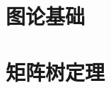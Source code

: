 \section{图论基础}
\label{gtbasic:sec:basic}

\questions


\section{矩阵树定理}
\label{gtbasic:sec:mtt}

\questions
